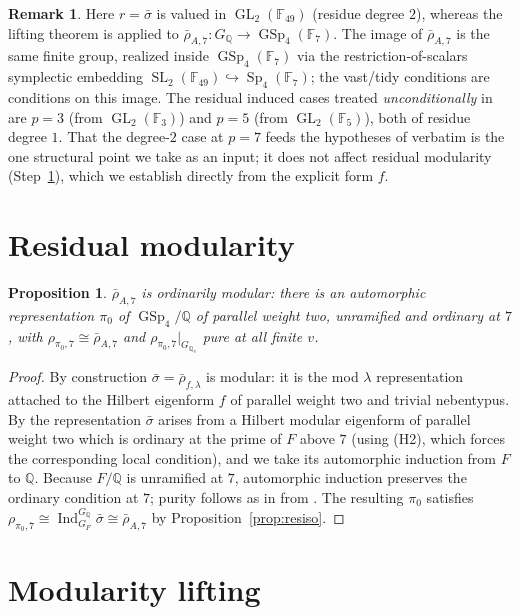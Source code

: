 \documentclass[11pt]{article}
\newtheorem{proposition}{Proposition}
\theoremstyle{definition}
\newtheorem{remark}{Remark}
\DeclareMathOperator{\GL}{GL}
\DeclareMathOperator{\GSp}{GSp}
\DeclareMathOperator{\SL}{SL}
\DeclareMathOperator{\Sp}{Sp}
\DeclareMathOperator{\Ind}{Ind}
\newcommand{\Q}{\mathbb{Q}}
\newcommand{\F}{\mathbb{F}}
\newcommand{\GQ}{G_{\Q}}
\newcommand{\GF}{G_F}
\newcommand{\lam}{\lambda}
\newcommand{\rbar}{\bar\rho}
\newcommand{\sbar}{\bar\sigma}
\begin{document}
\begin{remark}\label{rem:F49}
Here $r=\sbar$ is valued in $\GL_2(\F_{49})$ (residue degree $2$), whereas the
lifting theorem is applied to $\rbar_{A,7}\colon\GQ\to\GSp_4(\F_7)$. The image of
$\rbar_{A,7}$ is the same finite group, realized inside $\GSp_4(\F_7)$ via the
restriction-of-scalars symplectic embedding $\SL_2(\F_{49})\hookrightarrow
\Sp_4(\F_7)$; the vast/tidy conditions are conditions on this image. The residual
induced cases treated \emph{unconditionally} in \cite[Prop.\ 10.1.3]{BCGP} are
$p=3$ (from $\GL_2(\F_3)$) and $p=5$ (from $\GL_2(\F_5)$), both of residue degree
$1$. That the degree-$2$ case at $p=7$ feeds the hypotheses of
\cite[Prop.\ 10.1.1]{BCGP} verbatim is the one structural point we take as an
input; it does not affect residual modularity (Step~\ref{sec:resmod}), which we
establish directly from the explicit form $f$.
\end{remark}

\section{Residual modularity}\label{sec:resmod}

\begin{proposition}\label{prop:resmod}
$\rbar_{A,7}$ is ordinarily modular: there is an automorphic representation $\pi_0$
of $\GSp_4/\Q$ of parallel weight two, unramified and ordinary at $7$, with
$\rho_{\pi_0,7}\cong\rbar_{A,7}$ and $\rho_{\pi_0,7}|_{G_{\Q_v}}$ pure at all finite $v$.
\end{proposition}

\begin{proof}
By construction $\sbar=\rbar_{f,\lam}$ is modular: it is the mod $\lam$
representation attached to the Hilbert eigenform $f$ of parallel weight two and
trivial nebentypus. By \cite[Thm.\ A]{BLGG} the representation $\sbar$ arises from a
Hilbert modular eigenform of parallel weight two which is ordinary at the prime of
$F$ above $7$ (using (H2), which forces the corresponding local condition), and we
take its automorphic induction from $F$ to $\Q$. Because $F/\Q$ is unramified at
$7$, automorphic induction preserves the ordinary condition at $7$; purity follows
as in \cite[Thm.\ 9.2.8]{BCGP} from \cite{Blasius,Caraiani}. The resulting $\pi_0$
satisfies $\rho_{\pi_0,7}\cong\Ind_{\GF}^{\GQ}\sbar\cong\rbar_{A,7}$ by
Proposition~\ref{prop:resiso}.
\end{proof}

\section{Modularity lifting}\label{sec:lift}
\end{document}
